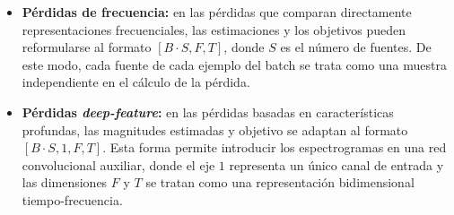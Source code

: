 \begin{itemize}
    \begin{itemize}
        \item \textbf{Pérdidas de frecuencia:} en las pérdidas que comparan directamente representaciones frecuenciales, las estimaciones y los objetivos pueden reformularse al formato \([B \cdot S, F, T]\), donde \(S\) es el número de fuentes. De este modo, cada fuente de cada ejemplo del batch se trata como una muestra independiente en el cálculo de la pérdida.

        \item \textbf{Pérdidas \textit{deep-feature}:} en las pérdidas basadas en características profundas, las magnitudes estimadas y objetivo se adaptan al formato \([B \cdot S, 1, F, T]\). Esta forma permite introducir los espectrogramas en una red convolucional auxiliar, donde el eje \(1\) representa un único canal de entrada y las dimensiones \(F\) y \(T\) se tratan como una representación bidimensional tiempo-frecuencia.
    \end{itemize}

\end{itemize}
